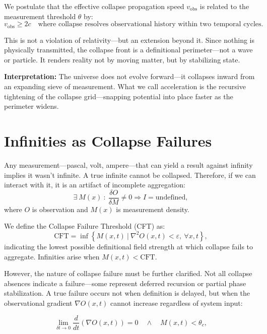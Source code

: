 We postulate that the effective collapse propagation speed $v_{\text{obs}}$ is related to the measurement threshold $\theta$ by:
\begin{equation}
v_{\text{obs}} \geq 2c \quad \text{where collapse resolves observational history within two temporal cycles.}
\end{equation}

This is not a violation of relativity—but an extension beyond it. Since nothing is physically transmitted, the collapse front is a definitional perimeter—not a wave or particle. It renders reality not by moving matter, but by stabilizing state.

\textbf{Interpretation:} The universe does not evolve forward—it collapses inward from an expanding sieve of measurement. What we call acceleration is the recursive tightening of the collapse grid—snapping potential into place faster as the perimeter widens.

\section{Infinities as Collapse Failures}

Any measurement—pascal, volt, ampere—that can yield a result against infinity implies it wasn't infinite. A true infinite cannot be collapsed. Therefore, if we can interact with it, it is an artifact of incomplete aggregation:
\[
\exists\ M(x)\ :\ \frac{\delta O}{\delta M} \neq 0 \Rightarrow I = \text{undefined},
\]
where $O$ is observation and $M(x)$ is measurement density.

We define the Collapse Failure Threshold (CFT) as:
\begin{equation}
\text{CFT} = \inf \left\{ M(x,t) \ | \ \nabla^2 O(x,t) < \varepsilon, \ \forall x,t \right\},
\end{equation}
indicating the lowest possible definitional field strength at which collapse fails to aggregate. Infinities arise when $M(x,t) < \text{CFT}$.

However, the nature of collapse failure must be further clarified. Not all collapse absences indicate a failure—some represent deferred recursion or partial phase stabilization. A true failure occurs not when definition is delayed, but when the observational gradient $\nabla O(x,t)$ cannot increase regardless of system input:

\begin{equation}
\lim_{\delta t \to 0} \frac{d}{dt} \left( \nabla O(x,t) \right) = 0 \quad \land \quad M(x,t) < \theta_c,
\end{equation}

